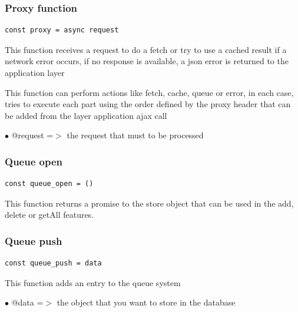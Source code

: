 \documentclass[a4paper]{article}
\begin{document}
\hypertarget{toc264}{}
\subsubsection{Proxy function}

\begin{lstlisting}
const proxy = async request
\end{lstlisting}

This function receives a request to do a fetch or try to use a cached result
if a network error occurs, if no response is available, a json error is returned
to the application layer

This function can perform actions like fetch, cache, queue or error, in each
case, tries to execute each part using the order defined by the proxy header
that can be added from the layer application ajax call

\begin{compactitem}
\item[\color{myblue}$\bullet$] @request =$>$ the request that must to be processed
\end{compactitem}

\hypertarget{toc265}{}
\subsubsection{Queue open}

\begin{lstlisting}
const queue_open = ()
\end{lstlisting}

This function returns a promise to the store object that can be used
in the add, delete or getAll features.

\hypertarget{toc266}{}
\subsubsection{Queue push}

\begin{lstlisting}
const queue_push = data
\end{lstlisting}

This function adds an entry to the queue system

\begin{compactitem}
\item[\color{myblue}$\bullet$] @data =$>$ the object that you want to store in the database
\end{compactitem}

\hypertarget{toc267}{}
\end{document}
